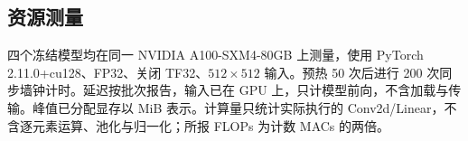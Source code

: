 \subsection{资源测量}
\label{sec:appendix-resources}
四个冻结模型均在同一 NVIDIA A100-SXM4-80GB 上测量，使用 PyTorch 2.11.0+cu128、FP32、关闭 TF32、$512\times512$ 输入。预热 50 次后进行 200 次同步墙钟计时。延迟按批次报告，输入已在 GPU 上，只计模型前向，不含加载与传输。峰值已分配显存以 MiB 表示。计算量只统计实际执行的 Conv2d/Linear，不含逐元素运算、池化与归一化；所报 FLOPs 为计数 MACs 的两倍。
